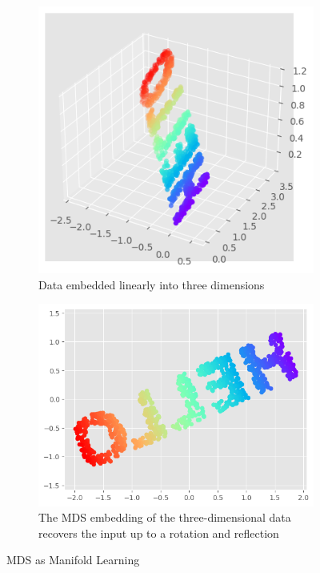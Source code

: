 \begin{figure}
    \centering
    \begin{subfigure}[b]{.45\textwidth}
        \includegraphics[width=\textwidth]{../Figures/fig46-5.png}
        \caption{Data embedded linearly into three dimensions}
    \end{subfigure}
    \hfill
    \begin{subfigure}[b]{.45\textwidth}
        \includegraphics[width=\textwidth]{../Figures/fig46-6.png}
        \caption{The MDS embedding of the three-dimensional data recovers the input up to a rotation and reflection}
    \end{subfigure}
    \caption{MDS as Manifold Learning}
\end{figure}


